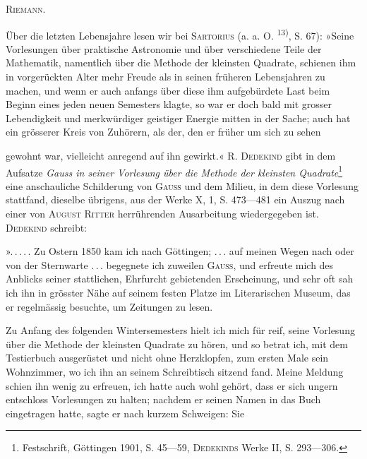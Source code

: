 \par\medskip
\begin{center}\quad\textsc{Riemann.}\end{center}
\noindent\hspace*{\parindent}Über die letzten Lebensjahre lesen wir bei \textsc{Sartorius} (a. a. O. \textsuperscript{13)}, S. 67):
»Seine Vorlesungen über praktische Astronomie und über verschiedene Teile
der Mathematik, namentlich über die Methode der kleinsten Quadrate, schienen
ihm in vorgerückten Alter mehr Freude als in seinen früheren Lebensjahren
zu machen, und wenn er auch anfangs über diese ihm aufgebürdete Last beim
Beginn eines jeden neuen Semesters klagte, so war er doch bald mit grosser
Lebendigkeit und merkwürdiger geistiger Energie mitten in der Sache; auch
hat ein grösserer Kreis von Zuhörern, als der, den er früher um sich zu sehen\par
\clearpage{}
\noindent gewohnt war, vielleicht anregend auf ihn gewirkt.« \textsc{R. Dedekind} gibt in dem
Aufsatze \textit{Gauss in seiner Vorlesung über die Methode der kleinsten Quadrate}\footnote{Festschrift, Göttingen 1901, S. 45—59, \textsc{Dedekinds} Werke II, S. 293—306.}
eine anschauliche Schilderung von \textsc{Gauss} und dem Milieu, in dem diese Vorlesung
stattfand, dieselbe übrigens, aus der Werke X, 1, S. 473—481 ein Auszug
nach einer von \textsc{August Ritter} herrührenden Ausarbeitung wiedergegeben
ist. \textsc{Dedekind} schreibt:
\par
»\mbox{.\,.\,.\,.\,.} Zu Ostern 1850 kam ich nach Göttingen; \mbox{.\,.\,.} auf meinen Wegen
nach oder von der Sternwarte \mbox{.\,.\,.} begegnete ich zuweilen \textsc{Gauss}, und erfreute
mich des Anblicks seiner stattlichen, Ehrfurcht gebietenden Erscheinung, und
sehr oft sah ich ihn in grösster Nähe auf seinem festen Platze im Literarischen
Museum, das er regelmässig besuchte, um Zeitungen zu lesen.
\par
Zu Anfang des folgenden Wintersemesters hielt ich mich für reif, seine
Vorlesung über die Methode der kleinsten Quadrate zu hören, und so betrat
ich, mit dem Testierbuch ausgerüstet und nicht ohne Herzklopfen, zum ersten
Male sein Wohnzimmer, wo ich ihn an seinem Schreibtisch sitzend fand.
Meine Meldung schien ihn wenig zu erfreuen, ich hatte auch wohl gehört,
dass er sich ungern entschloss Vorlesungen zu halten; nachdem er seinen
Namen in das Buch eingetragen hatte, sagte er nach kurzem Schweigen: Sie
